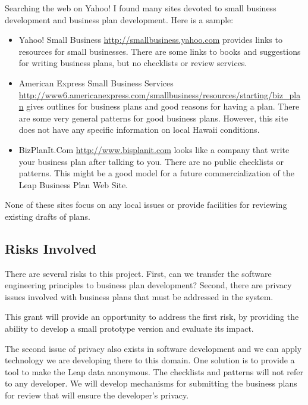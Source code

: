 Searching the web on Yahoo! I found many sites devoted to small business
development and business plan development.  Here is a sample:
\begin{itemize}

\item {Yahoo! Small Business
    \url{http://smallbusiness.yahoo.com}  provides links to resources for
    small businesses.  There are some links to books and suggestions for
    writing business plans, but no checklists or review services.}

\item {American Express Small Business Services
    \url{http://www6.americanexpress.com/smallbusiness/resources/starting/biz_plan} 
    gives outlines for business plans and good reasons for having a plan.
    There are some very general patterns for good business plans. However,
    this site does not have any specific information on local Hawaii conditions.}
  
\item {BizPlanIt.Com \url{http://www.bisplanit.com} looks like a company
    that write your business plan after talking to you.  There are no public
    checklists or patterns.  This might be a good model for a future
    commercialization of the Leap Business Plan Web Site.}
  
\end{itemize}

None of these sites focus on any local issues or provide facilities for
reviewing existing drafts of plans.

\subsection{Risks Involved}


There are several risks to this project. First, can we transfer the software
engineering principles to business plan development?  Second, there are privacy
issues involved with business plans that must be addressed in the system.

This grant will provide an opportunity to address the first risk, by
providing the ability to develop a small prototype version and evaluate its
impact.

The second issue of privacy also exists in software development and we can
apply technology we are developing there to this domain.  One solution is
to provide a tool to make the Leap data anonymous.  The checklists and
patterns will not refer to any developer.  We will develop mechanisms for
submitting the business plans for review that will ensure the developer's
privacy.


